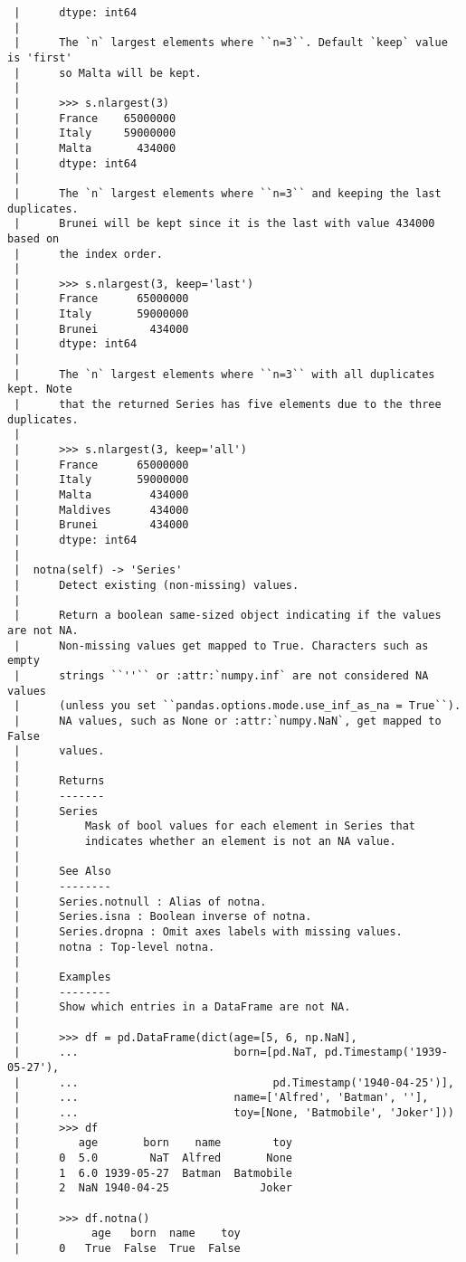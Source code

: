 \documentclass[
  letterpaper,
  DIV=11,
  numbers=noendperiod]{scrreprt}
\begin{document}
\begin{verbatim}
 |      dtype: int64
 |      
 |      The `n` largest elements where ``n=3``. Default `keep` value is 'first'
 |      so Malta will be kept.
 |      
 |      >>> s.nlargest(3)
 |      France    65000000
 |      Italy     59000000
 |      Malta       434000
 |      dtype: int64
 |      
 |      The `n` largest elements where ``n=3`` and keeping the last duplicates.
 |      Brunei will be kept since it is the last with value 434000 based on
 |      the index order.
 |      
 |      >>> s.nlargest(3, keep='last')
 |      France      65000000
 |      Italy       59000000
 |      Brunei        434000
 |      dtype: int64
 |      
 |      The `n` largest elements where ``n=3`` with all duplicates kept. Note
 |      that the returned Series has five elements due to the three duplicates.
 |      
 |      >>> s.nlargest(3, keep='all')
 |      France      65000000
 |      Italy       59000000
 |      Malta         434000
 |      Maldives      434000
 |      Brunei        434000
 |      dtype: int64
 |  
 |  notna(self) -> 'Series'
 |      Detect existing (non-missing) values.
 |      
 |      Return a boolean same-sized object indicating if the values are not NA.
 |      Non-missing values get mapped to True. Characters such as empty
 |      strings ``''`` or :attr:`numpy.inf` are not considered NA values
 |      (unless you set ``pandas.options.mode.use_inf_as_na = True``).
 |      NA values, such as None or :attr:`numpy.NaN`, get mapped to False
 |      values.
 |      
 |      Returns
 |      -------
 |      Series
 |          Mask of bool values for each element in Series that
 |          indicates whether an element is not an NA value.
 |      
 |      See Also
 |      --------
 |      Series.notnull : Alias of notna.
 |      Series.isna : Boolean inverse of notna.
 |      Series.dropna : Omit axes labels with missing values.
 |      notna : Top-level notna.
 |      
 |      Examples
 |      --------
 |      Show which entries in a DataFrame are not NA.
 |      
 |      >>> df = pd.DataFrame(dict(age=[5, 6, np.NaN],
 |      ...                        born=[pd.NaT, pd.Timestamp('1939-05-27'),
 |      ...                              pd.Timestamp('1940-04-25')],
 |      ...                        name=['Alfred', 'Batman', ''],
 |      ...                        toy=[None, 'Batmobile', 'Joker']))
 |      >>> df
 |         age       born    name        toy
 |      0  5.0        NaT  Alfred       None
 |      1  6.0 1939-05-27  Batman  Batmobile
 |      2  NaN 1940-04-25              Joker
 |      
 |      >>> df.notna()
 |           age   born  name    toy
 |      0   True  False  True  False

\end{verbatim}
\end{document}
